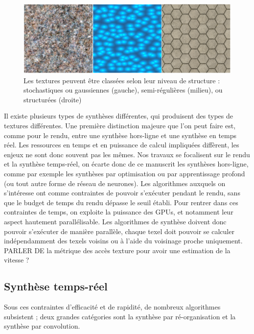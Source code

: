 \begin{figure}[H]
    \centering
    \includegraphics[width=\textwidth]{contenu/resources/images/structure_scale}
    \caption[Classification des textures selon leur niveau de structure]{Les textures peuvent être classées selon leur niveau de structure : stochastiques ou gaussiennes (gauche), semi-régulières (milieu), ou structurées (droite)}
    \label{fig:échelle-structure}
\end{figure}

Il existe plusieurs types de synthèses différentes, qui produisent des types de textures différentes. Une première distinction majeure que l'on peut faire est, comme pour le rendu, entre une synthèse hors-ligne et une synthèse en temps réel. Les ressources en temps et en puissance de calcul impliquées diffèrent, les enjeux ne sont donc souvent pas les mêmes. Nos travaux se focalisent sur le rendu et la synthèse temps-réel, on écarte donc de ce manuscrit les synthèses hors-ligne, comme par exemple les synthèses par optimisation ou par apprentissage profond (ou tout autre forme de réseau de neurones). Les algorithmes auxquels on s'intéresse ont comme contraintes de pouvoir s'exécuter pendant le rendu, sans que le budget de temps du rendu dépasse le seuil établi. Pour rentrer dans ces contraintes de temps, on exploite la puissance des GPUs, et notamment leur aspect hautement parallélisable. Les algorithmes de synthèse doivent donc pouvoir s'exécuter de manière parallèle, chaque texel doit pouvoir se calculer indépendamment des texels voisins ou à l'aide du voisinage proche uniquement.
{\color{red}PARLER DE la métrique des accès texture pour avoir une estimation de la vitesse ?}


\subsection*{Synthèse temps-réel} %

Sous ces contraintes d'efficacité et de rapidité, de nombreux algorithmes subsistent ; deux grandes catégories sont la synthèse par ré-organisation et la synthèse par convolution.

